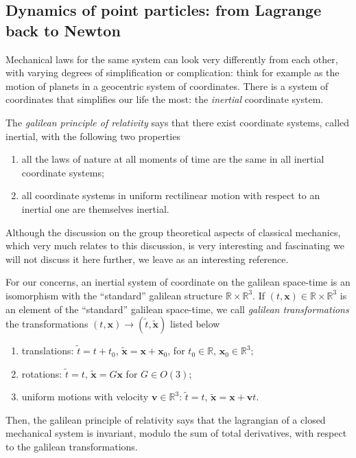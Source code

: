 \documentclass[english,fontsize=11pt,paper=a5,oneside]{scrbook}
\newcommand{\R}{\mathbb{R}}
\newcommand{\bx}{\bm{x}}
\theoremstyle{definition}
\begin{document}
\subsection{Dynamics of point particles: from Lagrange back to Newton}\label{sec:dynamicspps}

Mechanical laws for the same system can look very differently from each other, with varying degrees of simplification or complication: think for example as the motion of planets in a geocentric system of coordinates.
There is a system of coordinates that simplifies our life the most: the \emph{inertial} coordinate system.

\begin{tcolorbox}
The \emph{galilean principle of relativity} says that there exist coordinate systems, called inertial, with the following two properties
\begin{enumerate}
    \item all the laws of nature at all moments of time are the same in all inertial coordinate systems;
    \item all coordinate systems in uniform rectilinear motion with respect to an inertial one are themselves inertial.
\end{enumerate}
\end{tcolorbox}

Although the discussion on the group theoretical aspects of classical mechanics, which very much relates to this discussion, is very interesting and fascinating we will not discuss it here further, we leave \cite{book:marsdenratiu} as an interesting reference.

For our concerns, an inertial system of coordinate on the galilean space-time is an isomorphism with the ``standard'' galilean structure $\R\times\R^3$.
If $(t, \bx) \in \R\times \R^3$ is an element of the ``standard'' galilean space-time, we call \emph{galilean transformations} the transformations $(t,\bx) \to (\tilde t, \tilde{\bx})$ listed below
\begin{enumerate}
    \item translations: $\tilde t = t + t_0$, $\tilde{\bx} = \bx + \bx_0$, for $t_0\in\R$, $\bx_0\in\R^3$;
    \item rotations: $\tilde t = t$, $\tilde{\bx} = G\bx$ for $G\in O(3)$;
    \item uniform motions with velocity $\bm{v}\in\R^3$: $\tilde t = t$, $\tilde{\bx} = \bx + \bm{v} t$.
\end{enumerate}
Then, the galilean principle of relativity says that the lagrangian of a closed mechanical system is invariant, modulo the sum of total derivatives, with respect to the galilean transformations.
\end{document}
